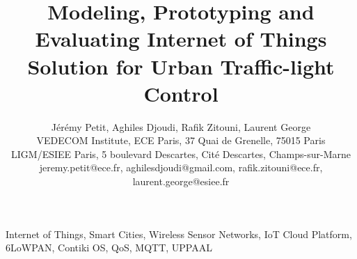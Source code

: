 \documentclass[conference]{../../IEEEtran}
\title{Modeling, Prototyping and Evaluating Internet of Things Solution for Urban Traffic-light Control}
\author{
		Jérémy Petit\Mark{1},
		Aghiles Djoudi\Mark{3}, 
		Rafik Zitouni\Mark{2}\Mark{3}, 
		Laurent George\Mark{3}\\
		
		\Mark{1} VEDECOM Institute, %
		\Mark{2} ECE Paris, 37 Quai de Grenelle, 75015 Paris \\
		\Mark{3} LIGM/ESIEE Paris, 5 boulevard Descartes, Cité Descartes, Champs-sur-Marne \\
		
		jeremy.petit@ece.fr, 
		aghilesdjoudi@gmail.com, 
		rafik.zitouni@ece.fr, 
		laurent.george@esiee.fr
}
\begin{document}
\maketitle



\begin{IEEEkeywords}
	Internet of Things, Smart Cities, Wireless Sensor Networks, IoT Cloud Platform, 6LoWPAN, Contiki OS, QoS, MQTT, UPPAAL
\end{IEEEkeywords}



\printbibliography
\end{document}
